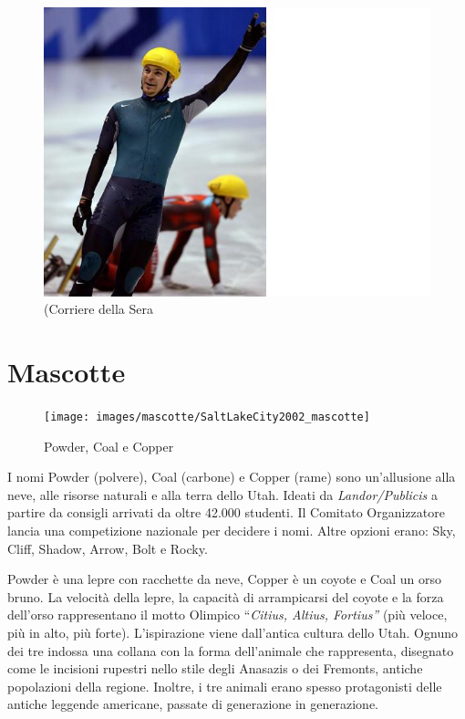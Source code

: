 \documentclass[
]{book}
\begin{document}
\begin{figure}
\includegraphics[width=0.8\linewidth]{images/corriere/2002(3)} \caption{(Corriere della Sera}\label{fig:unnamed-chunk-73}
\end{figure}

\section*{Mascotte}\label{mascotte-8}

\begin{figure}
\texttt{[image: images/mascotte/SaltLakeCity2002\_mascotte]} \caption{Powder, Coal e Copper}\label{fig:unnamed-chunk-74}
\end{figure}

I nomi Powder (polvere), Coal (carbone) e Copper (rame) sono un'allusione alla neve, alle risorse naturali e alla terra dello Utah.
Ideati da \emph{Landor/Publicis} a partire da consigli arrivati da oltre 42.000 studenti. Il Comitato Organizzatore lancia una competizione nazionale per decidere i nomi. Altre opzioni erano: Sky, Cliff, Shadow, Arrow, Bolt e Rocky.

Powder è una lepre con racchette da neve, Copper è un coyote e Coal un orso bruno. La velocità della lepre, la capacità di arrampicarsi del coyote e la forza dell'orso rappresentano il motto Olimpico ``\emph{Citius, Altius, Fortius''} (più veloce, più in alto, più forte). L'ispirazione viene dall'antica cultura dello Utah.
Ognuno dei tre indossa una collana con la forma dell'animale che rappresenta, disegnato come le incisioni rupestri nello stile degli Anasazis o dei Fremonts, antiche popolazioni della regione. Inoltre, i tre animali erano spesso protagonisti delle antiche leggende americane, passate di generazione in generazione.
\end{document}
